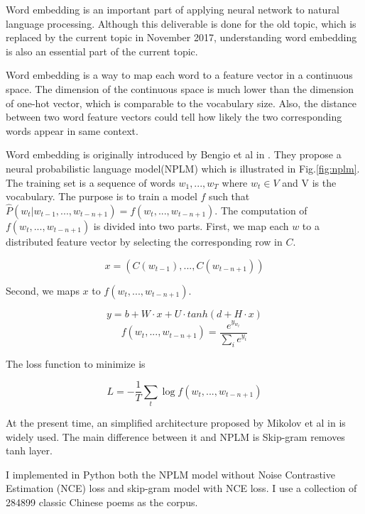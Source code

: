 \documentclass[12pt]{article}
\begin{document}
Word embedding is an important part of applying neural network to natural language processing. Although this deliverable is done for the old topic, which is replaced by the current topic in November 2017, understanding word embedding is also an essential part of the current topic.

Word embedding is a way to map each word to a feature vector in a continuous space. The dimension of the continuous space is much lower than the dimension of one-hot vector, which is comparable to the vocabulary size. Also, the distance between two word feature vectors could tell how likely the two corresponding words appear in same context.

Word embedding is originally introduced by  Bengio et al in \cite{bengio2003neural}. They propose a neural probabilistic language model(NPLM) which is illustrated in Fig.\ref{fig:nplm}. The training set is a sequence of words $w_1,...,w_T$ where $w_t \in V$ and V is the vocabulary. The purpose is to train a model $f$ such that $ \hat{P}(w_t | w_{t-1},...,w_{t-n+1}) = f(w_t, ..., w_{t-n+1})$. The computation of $f(w_t, ..., w_{t-n+1})$ is divided into two parts.
First, we map each $w$ to a distributed feature vector by selecting the corresponding row in $C$.

$$x=(C(w_{t-1}),... ,C(w_{t-n+1}))$$

Second, we maps $x$ to $f(w_t, ..., w_{t-n+1})$.


$$y=b+W\cdot x + U\cdot tanh(d + H\cdot x)$$
$$ f(w_t, ..., w_{t-n+1}) = \frac{e^{y_{w_t}}}{\sum_{i}^{}e^{y_i}}$$

The loss function to minimize is

$$L = -\frac{1}{T}\sum _{t}^{} \log{f(w_t, ..., w_{t-n+1})}$$


At the present time, an simplified architecture proposed by Mikolov et al in \cite{mikolov2013efficient} is widely used. The main difference between it and NPLM is Skip-gram removes tanh layer.

I implemented in Python both the NPLM model without Noise Contrastive Estimation (NCE) loss and skip-gram model with NCE loss. I use a collection of 284899 classic Chinese poems as the corpus.
\end{document}
